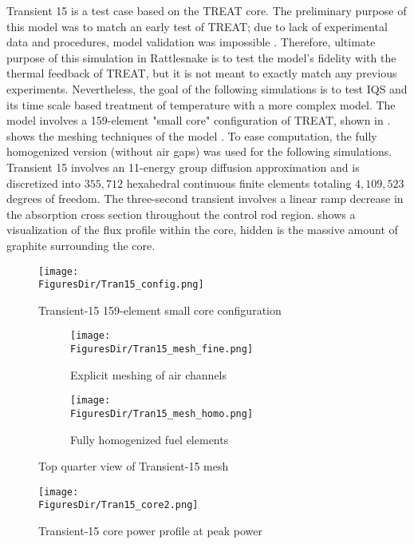 Transient 15 is a test case based on the TREAT core. The preliminary purpose of this model was to match an early test of TREAT; due to lack of experimental data and procedures, model validation was impossible \cite{mammoth}. Therefore, ultimate purpose of this simulation in Rattlesnake is to test the model's fidelity with the thermal feedback of TREAT, but it is not meant to exactly match any previous experiments.  Nevertheless, the goal of the following simulations is to test IQS and its time scale based treatment of temperature with a more complex model. The model involves a 159-element "small core" configuration of TREAT, shown in  \cite{Tran15}.  shows the meshing techniques of the model \cite{mammoth}. To ease computation, the fully homogenized version (without air gaps) was used  for the following simulations. Transient 15 involves an 11-energy group diffusion approximation and is discretized into $355,712$ hexahedral continuous finite elements totaling $4,109,523$ degrees of freedom.  The three-second transient involves a linear ramp decrease in the absorption cross section throughout the control rod region.  shows a visualization of the flux profile within the core, hidden is the massive amount of graphite surrounding the core.   
\begin{figure}[htbp!]
\centering
\texttt{[image: \\FiguresDir/Tran15\_config.png]}
\caption{Transient-15 159-element small core configuration}
\label{fig:Tran15_config}
\end{figure}

\begin{figure}[!htbp]
\centering
\begin{subfigure}[!htbp]{0.49\textwidth}
\texttt{[image: \\FiguresDir/Tran15\_mesh\_fine.png]}
\caption{Explicit meshing of air channels}
\label{fig:Tran15_mesh_fine}
\end{subfigure}
\begin{subfigure}[!htbp]{0.49\textwidth}
\texttt{[image: \\FiguresDir/Tran15\_mesh\_homo.png]}
\caption{Fully homogenized fuel elements}
\label{fig:Tran15_mesh_homo}
\end{subfigure}
\caption{Top quarter view of Transient-15 mesh}
\label{fig:Tran15_mesh}
\end{figure}

\begin{figure}[htbp!]
\centering
\texttt{[image: \\FiguresDir/Tran15\_core2.png]}
\caption{Transient-15 core power profile at peak power}
\label{fig:Tran15}
\end{figure}

